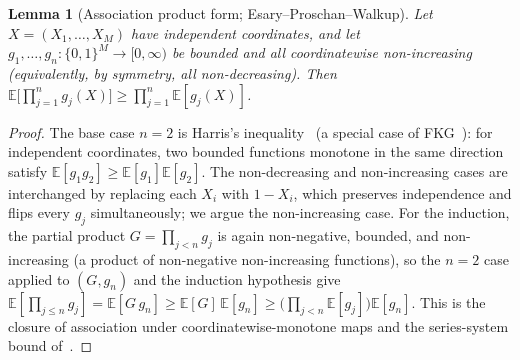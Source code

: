 \documentclass[11pt]{article}
\newtheorem{lemma}{Lemma}
\theoremstyle{definition}
\theoremstyle{remark}
\begin{document}
\begin{lemma}[Association product form; Esary--Proschan--Walkup]\label{lem:harris}
Let $X=(X_1,\dots,X_M)$ have independent coordinates, and let $g_1,\dots,g_n:\{0,1\}^M\to[0,\infty)$
be bounded and all coordinatewise non-increasing (equivalently, by symmetry, all non-decreasing). Then
$\mathbb{E}\big[\prod_{j=1}^n g_j(X)\big]\ge\prod_{j=1}^n\mathbb{E}[g_j(X)]$.
\end{lemma}
\begin{proof}
The base case $n=2$ is Harris's inequality~\cite{harris1960} (a special case of FKG~\cite{fkg1971}):
for independent coordinates, two bounded functions monotone in the same direction satisfy
$\mathbb{E}[g_1 g_2]\ge\mathbb{E}[g_1]\mathbb{E}[g_2]$. The non-decreasing and non-increasing cases are
interchanged by replacing each $X_i$ with $1-X_i$, which preserves independence and flips every $g_j$
simultaneously; we argue the non-increasing case. For the induction, the partial product
$G=\prod_{j<n}g_j$ is again non-negative, bounded, and non-increasing (a product of non-negative
non-increasing functions), so the $n=2$ case applied to $(G,g_n)$ and the induction hypothesis give
$\mathbb{E}[\prod_{j\le n}g_j]=\mathbb{E}[G\,g_n]\ge\mathbb{E}[G]\,\mathbb{E}[g_n]
\ge\big(\prod_{j<n}\mathbb{E}[g_j]\big)\mathbb{E}[g_n]$. This is the closure of association under
coordinatewise-monotone maps and the series-system bound of~\cite{esary1967}.
\end{proof}
\end{document}
